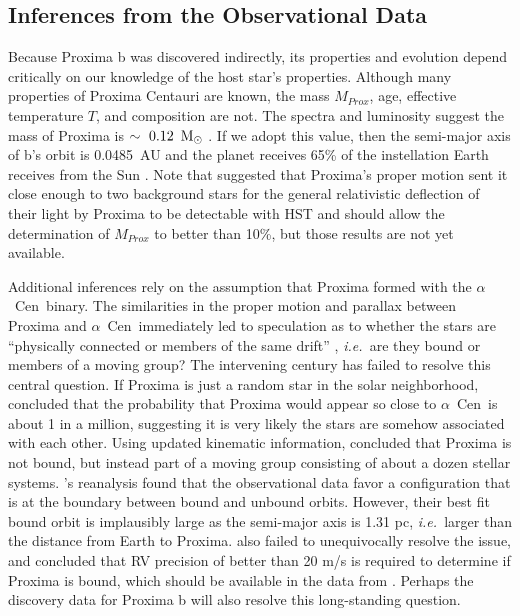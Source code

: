 \documentclass[preprint,12pt]{aastex}
\def\msun{{\rm\,M_\odot}}
\def\ie{{\it i.e.\ }}
\def\acen{{$\alpha$~Cen}}
\begin{document}
\subsection{Inferences from the Observational Data}
\label{sec:obs:inf}
Because Proxima b was discovered indirectly, its properties and
evolution depend critically on our knowledge of the host star's
properties. Although many properties of Proxima Centauri are known, the mass $M_{Prox}$,
age, effective temperature $T$, and composition are not. The spectra and luminosity suggest
the mass of Proxima is $\sim~0.12~\msun$ \citep{Delfosse00}. If we
adopt this value, then the semi-major axis of b's orbit is 0.0485~AU
and the planet receives 65\% of the instellation Earth receives
from the Sun \citep{AngladaEscude16}.  Note that \cite{Sahu14}
suggested that Proxima's proper motion sent it close enough to two
background stars for the general relativistic deflection of their
light by Proxima to be detectable with HST and should allow the determination of
$M_{Prox}$ to better than 10\%, but those results are not yet available.

Additional inferences rely on the assumption that Proxima formed with
the \acen~binary.  The similarities in the proper motion and parallax
between Proxima and \acen~immediately led to speculation as to whether
the stars are ``physically connected or members of the same drift''
\citep{Voute1917}, \ie are they bound or members of a moving group?
The intervening century has failed to resolve this central
question. If Proxima is just a random star in the solar neighborhood,
\cite{MatthewsGilmore93} concluded that the probability that Proxima would
appear so close to \acen~is about 1 in a million, suggesting it is
very likely the stars are somehow associated with each other. Using
updated kinematic information, \cite{Anosova94} concluded that Proxima
is not bound, but instead part of a moving group consisting of about a
dozen stellar systems. \cite{WertheimerLaughlin06}'s reanalysis found
that the observational data favor a configuration that is at the
boundary between bound and unbound orbits. However, their best fit
bound orbit is implausibly large as the semi-major axis is 1.31 pc,
\ie larger than the distance from Earth to
Proxima. \cite{MatvienkoOrlov14} also failed to unequivocally resolve
the issue, and concluded that RV precision of better than 20 m/s is
required to determine if Proxima is bound, which should be available
in the data from \cite{AngladaEscude16}. Perhaps the discovery data
for Proxima b will also resolve this long-standing question.
\end{document}

